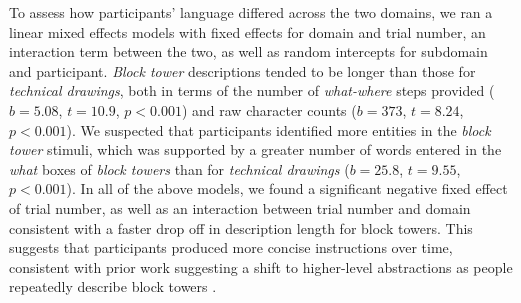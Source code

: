 \documentclass[10pt,letterpaper]{article}
\begin{document}
To assess how participants' language differed across the two domains, we ran a linear mixed effects models with fixed effects for domain and trial number, an interaction term between the two, as well as random intercepts for subdomain and participant.
\textit{Block tower} descriptions tended to be longer than those for \textit{technical drawings}, both in terms of the number of \textit{what-where} steps provided ($b=5.08$, $t=10.9$, $p<0.001$) and raw character counts ($b=373$, $t=8.24$, $p<0.001$).
We suspected that participants identified more entities in the \textit{block tower} stimuli, which was supported by a greater number of words entered in the \textit{what} boxes of \textit{block towers} than for \textit{technical drawings} ($b=25.8$, $t=9.55$, $p<0.001$).
In all of the above models, we found a significant negative fixed effect of trial number, as well as an interaction between trial number and domain consistent with a faster drop off in description length for block towers.
This suggests that participants produced more concise instructions over time, consistent with prior work suggesting a shift to higher-level abstractions as people repeatedly describe block towers \cite{mccarthy2021learning}. %





\end{document}
